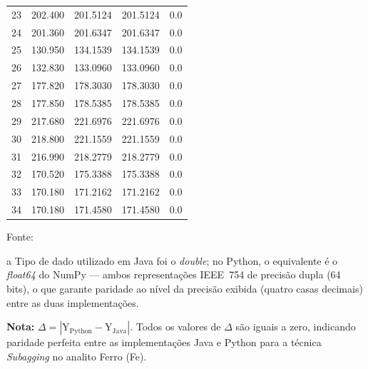 \begin{table}[H]
\begin{threeparttable}
{\begin{tabular}{
    S[table-format=2.0]
    S[table-format=3.3]
    S[table-format=3.4]
    S[table-format=3.4]
    S[table-format=1.1]
}
23  & 202.400  & 201.5124  & 201.5124  & 0.0 \\
24  & 201.360  & 201.6347  & 201.6347  & 0.0 \\
25  & 130.950  & 134.1539  & 134.1539  & 0.0 \\
26  & 132.830  & 133.0960  & 133.0960  & 0.0 \\
27  & 177.820  & 178.3030  & 178.3030  & 0.0 \\
28  & 177.850  & 178.5385  & 178.5385  & 0.0 \\
29  & 217.680  & 221.6976  & 221.6976  & 0.0 \\
30  & 218.800  & 221.1559  & 221.1559  & 0.0 \\
31  & 216.990  & 218.2779  & 218.2779  & 0.0 \\
32  & 170.520  & 175.3388  & 175.3388  & 0.0 \\
33  & 170.180  & 171.2162  & 171.2162  & 0.0 \\
34  & 170.180  & 171.4580  & 171.4580  & 0.0 \\
\bottomrule
\end{tabular}%
}
\begin{center}
\begin{minipage}{0.85\linewidth}
\begin{tablenotes}
\footnotesize
\item Fonte:~\oautor
\item[a] Tipo de dado utilizado em Java foi o \textit{double}; no Python,
o equivalente é o \textit{float64} do NumPy — ambos representações IEEE~754
de precisão dupla (64 bits), o que garante paridade ao nível da precisão exibida (quatro casas decimais) entre as
duas implementações.
\item \textbf{Nota:} $\Delta = |\text{Y}_{\text{Python}} - \text{Y}_{\text{Java}}|$.
Todos os valores de $\Delta$ são iguais a zero, indicando paridade
perfeita entre as implementações Java e Python para a técnica \textit{Subagging}
no analito Ferro (Fe).
\end{tablenotes}
\end{minipage}
\end{center}
\end{threeparttable}
\end{table}

